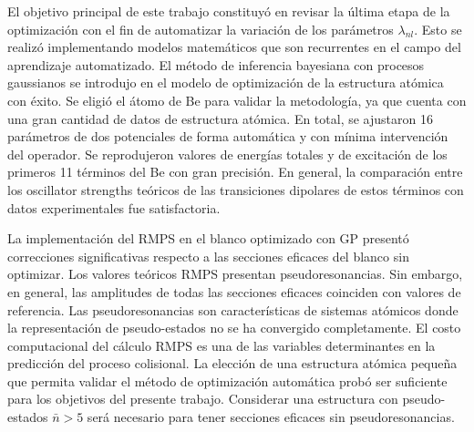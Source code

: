 El objetivo principal de este trabajo constituyó en revisar la última 
etapa de la optimización con el fin de automatizar la variación de los 
parámetros $\lambda_{nl}$. Esto se realizó implementando modelos 
matemáticos que son recurrentes en el campo del aprendizaje automatizado.
El método de inferencia bayesiana con procesos gaussianos se introdujo 
en el modelo de optimización de la estructura atómica con éxito. Se
eligió el átomo de Be para validar la metodología, ya que cuenta con 
una gran cantidad de datos de estructura atómica. En total, se ajustaron 
16 parámetros de dos potenciales de forma automática y con mínima 
intervención del operador. Se reprodujeron valores de energías totales y 
de excitación de los primeros 11 términos del Be con gran precisión. En 
general, la comparación entre los oscillator strengths teóricos de las 
transiciones dipolares de estos términos con datos experimentales fue 
satisfactoria. 

La implementación del RMPS en el blanco optimizado con GP presentó 
correcciones significativas respecto a las secciones eficaces del blanco 
sin optimizar. Los valores teóricos RMPS presentan pseudoresonancias. 
Sin embargo, en general, las amplitudes de todas las secciones eficaces 
coinciden con valores de referencia. Las pseudoresonancias son 
características de sistemas atómicos donde la representación de 
pseudo-estados no se ha convergido completamente. 
El costo computacional del cálculo RMPS es una de las variables 
determinantes en la predicción del proceso colisional. La elección de 
una estructura atómica pequeña que permita validar el método de 
optimización automática probó ser suficiente para los objetivos del 
presente trabajo. Considerar una estructura con pseudo-estados 
$\bar{n}>5$ será necesario para tener secciones eficaces sin 
pseudoresonancias.































